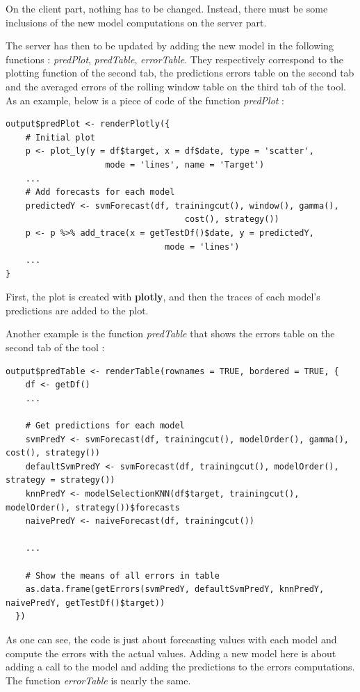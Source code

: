 \documentclass[11pt,a4paper,oneside]{book}
\begin{document}
On the client part, nothing has to be changed. Instead, there must be some inclusions of the new model computations on the server part.

The server has then to be updated by adding the new model in the following functions : \textit{predPlot}, \textit{predTable}, \textit{errorTable}. They respectively correspond to the plotting function of the second tab, the predictions errors table on the second tab and the averaged errors of the rolling window table on the third tab of the tool. As an example, below is a piece of code of the function \textit{predPlot} : \\

\begin{lstlisting}
output$predPlot <- renderPlotly({
    # Initial plot
    p <- plot_ly(y = df$target, x = df$date, type = 'scatter',
                    mode = 'lines', name = 'Target')
    ...
    # Add forecasts for each model
    predictedY <- svmForecast(df, trainingcut(), window(), gamma(), 
                                    cost(), strategy())
    p <- p %>% add_trace(x = getTestDf()$date, y = predictedY, 
                                mode = 'lines')
    ...
}
\end{lstlisting}

First, the plot is created with \textbf{plotly}, and then the traces of each model's predictions are added to the plot. 

Another example is the function \textit{predTable} that shows the errors table on the second tab of the tool : \\

\begin{lstlisting}
output$predTable <- renderTable(rownames = TRUE, bordered = TRUE, {
    df <- getDf()
    ...
    
    # Get predictions for each model
    svmPredY <- svmForecast(df, trainingcut(), modelOrder(), gamma(), cost(), strategy())
    defaultSvmPredY <- svmForecast(df, trainingcut(), modelOrder(), strategy = strategy())
    knnPredY <- modelSelectionKNN(df$target, trainingcut(), modelOrder(), strategy())$forecasts
    naivePredY <- naiveForecast(df, trainingcut())

    ...
    
    # Show the means of all errors in table
    as.data.frame(getErrors(svmPredY, defaultSvmPredY, knnPredY, naivePredY, getTestDf()$target))
  })
\end{lstlisting}  
  
As one can see, the code is just about forecasting values with each model and compute the errors with the actual values. Adding a new model here is about adding a call to the model and adding the predictions to the errors computations. The function \textit{errorTable} is nearly the same.
\end{document}

